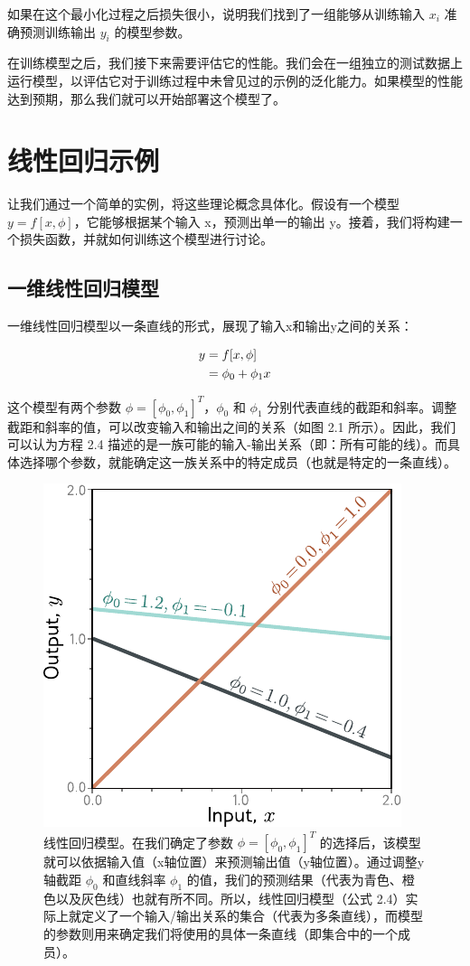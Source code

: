 \documentclass[lang=cn,newtx,10pt,scheme=chinese]{elegantbook}
\begin{document}
如果在这个最小化过程之后损失很小，说明我们找到了一组能够从训练输入 $x_i$ 准确预测训练输出 $y_i$ 的模型参数。

在训练模型之后，我们接下来需要评估它的性能。我们会在一组独立的测试数据上运行模型，以评估它对于训练过程中未曾见过的示例的泛化能力。如果模型的性能达到预期，那么我们就可以开始部署这个模型了。

\section{线性回归示例}

让我们通过一个简单的实例，将这些理论概念具体化。假设有一个模型 $y = f[x, \phi]$，它能够根据某个输入 x，预测出单一的输出 y。接着，我们将构建一个损失函数，并就如何训练这个模型进行讨论。

\subsection{一维线性回归模型}

一维线性回归模型以一条直线的形式，展现了输入x和输出y之间的关系：

\begin{align}
y &= f[x, \phi] \notag \\
&= \phi_0 + \phi_1 x 
\end{align}


这个模型有两个参数 $\phi = [\phi_0,\phi_1]^T$，$\phi_0$ 和 $\phi_1$ 分别代表直线的截距和斜率。调整截距和斜率的值，可以改变输入和输出之间的关系（如图 2.1 所示）。因此，我们可以认为方程 2.4 描述的是一族可能的输入-输出关系（即：所有可能的线）。而具体选择哪个参数，就能确定这一族关系中的特定成员（也就是特定的一条直线）。

\begin{figure}
	\centering
	\includegraphics[width=0.7\linewidth]{PDFFigures/UDLChap2PDF/SupervisedLinear.pdf}
	\caption{线性回归模型。在我们确定了参数 $\phi = [\phi_0 , \phi_1 ]^T$ 的选择后，该模型就可以依据输入值（x轴位置）来预测输出值（y轴位置）。通过调整y轴截距 $\phi_0$ 和直线斜率 $\phi_1$ 的值，我们的预测结果（代表为青色、橙色以及灰色线）也就有所不同。所以，线性回归模型（公式 2.4）实际上就定义了一个输入/输出关系的集合（代表为多条直线），而模型的参数则用来确定我们将使用的具体一条直线（即集合中的一个成员）。}
\end{figure}
\end{document}
